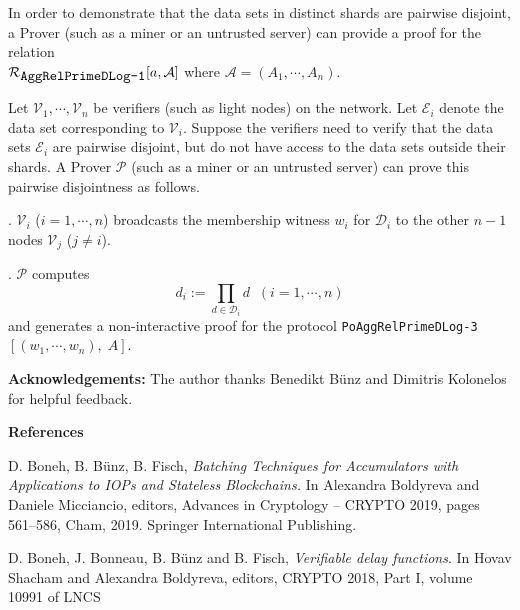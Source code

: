 \documentclass[11pt, lettersize, notitlepage, leqno, footskip=0.6cm]{article}
\newcommand{\pl}{\prod\limits}
\newcommand{\mc}{\mathcal}
\newcommand{\mP}{\mc{P}}
\newcommand{\V}{\mc{V}}
\newcommand{\vs}{\vspace{-0.15cm}}
\newcommand{\noin}{\noindent}
\numberwithin{equation}{section}
\begin{document}
In order to demonstrate that the data sets in distinct shards are pairwise disjoint, a Prover (such as a miner or an untrusted server) can provide a proof for the relation\\ $\mc{R}_{{\protect\verb|AggRelPrimeDLog-1|}}[a, \mc{A}]$ where $\mc{A} = (A_1,\cdots,A_n)$.\vspace{0.2cm}

Let $\V_1,\cdots,\V_n$ be verifiers (such as light nodes) on the network. Let $\mc{E}_i$ denote the data set corresponding to $\V_i$. Suppose the verifiers need to verify that the data sets $\mc{E}_i$ are pairwise disjoint, but do not have access to the data sets outside their shards. A Prover $\mP$ (such as a miner or an untrusted server) can prove this pairwise disjointness as follows.\vspace{0.1cm}

\noin 1. $\V_i$ ($i=1,\cdots,n$) broadcasts the membership witness $w_i$ for $\mc{D}_i$ to the other $n-1$ nodes $\V_j$ ($j\neq i$). 

\noin 2. $\mP$ computes \vs $$d_i:= \pl_{d\in\mc{D}_i} d\;\;(i=1,\cdots,n)$$ and generates a non-interactive proof for the protocol \verb|PoAggRelPrimeDLog-3|$[(w_1,\cdots,w_n),\; A]$.




\bigskip


\bigskip

\bigskip

\noin \textbf{Acknowledgements:} The author thanks Benedikt B\"{u}nz and Dimitris Kolonelos for helpful feedback.

\bigskip



\begin{center}\textbf{References} \end{center}
\footnotesize

\noindent [BBF19] D. Boneh, B. B\"{u}nz, B. Fisch, \textit{Batching Techniques for Accumulators with Applications to IOPs and Stateless Blockchains.} In Alexandra Boldyreva and Daniele Micciancio, editors, Advances in Cryptology – CRYPTO 2019, pages 561–586, Cham, 2019. Springer International Publishing. \vspace{0.1cm}

\noin [BBBF18] D. Boneh, J. Bonneau, B. B\"{u}nz and B. Fisch, \textit{Verifiable delay functions}. In Hovav Shacham and Alexandra Boldyreva, editors, CRYPTO 2018, Part I, volume 10991 of LNCS \vspace{0.1cm}
\end{document}
